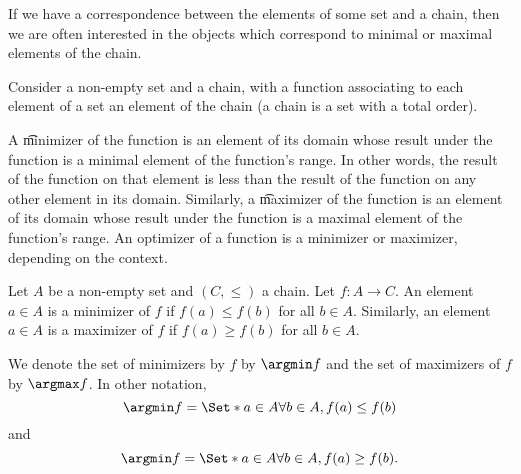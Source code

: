 

If we have a correspondence between the elements of some set and a chain, then we are often interested in the objects which correspond to minimal or maximal elements of the chain.


Consider a non-empty set and a chain, with a function associating to each element of a set an element of the chain (a chain is a set with a total order).

A \t{minimizer} of the function is an element of its domain whose result under the function is a minimal element of the function's range.
In other words, the result of the function on that element is less than the result of the function on any other element in its domain.
Similarly, a \t{maximizer} of the function is an element of its domain whose result under the function is a maximal element of the function's range.
An optimizer of a function is a minimizer or maximizer, depending on the context.


Let $A$ be a non-empty set and $(C, \leq)$ a chain.
Let $f: A \to C$.
An element $a \in A$ is a minimizer of $f$ if $f(a) \leq f(b)$ for all $b \in A$.
Similarly, an element $a \in A$ is a maximizer of $f$ if $f(a) \geq f(b)$ for all $b \in A$.

We denote the set of minimizers by $f$ by $\argmin f$ and the set of maximizers of $f$ by $\argmax f$. In other notation,
$$
  \argmin f = \Set*{a \in A}{\forall b \in A, f(a) \leq f(b) }
$$
and
$$
  \argmin f = \Set*{a \in A}{\forall b \in A, f(a) \geq f(b) }.
$$
